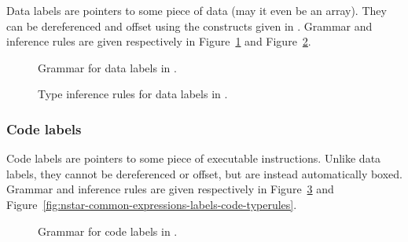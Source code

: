 Data labels are pointers to some piece of data (may it even be an array).
They can be dereferenced and offset using the constructs given in \nstar.
Grammar and inference rules are given respectively in Figure~\ref{fig:nstar-common-expressions-labels-data-grammar} and Figure~\ref{fig:nstar-common-expressions-labels-data-typerules}.

\begin{figure}[H]
  \centering

  \caption{Grammar for data labels in \nstar.}
  \label{fig:nstar-common-expressions-labels-data-grammar}
\end{figure}

\begin{figure}[H]
  \centering


  \caption{Type inference rules for data labels in \nstar.}
  \label{fig:nstar-common-expressions-labels-data-typerules}
\end{figure}

\subsubsection{Code labels}\label{subsubsec:nstar-common-expressions-labels-code}

Code labels are pointers to some piece of executable instructions.
Unlike data labels, they cannot be dereferenced or offset, but are instead automatically boxed.
Grammar and inference rules are given respectively in Figure~\ref{fig:nstar-common-expressions-labels-code-grammar} and Figure~\ref{fig:nstar-common-expressions-labels-code-typerules}.

\begin{figure}[H]
  \centering


  \caption{Grammar for code labels in \nstar.}
  \label{fig:nstar-common-expressions-labels-code-grammar}
\end{figure}

